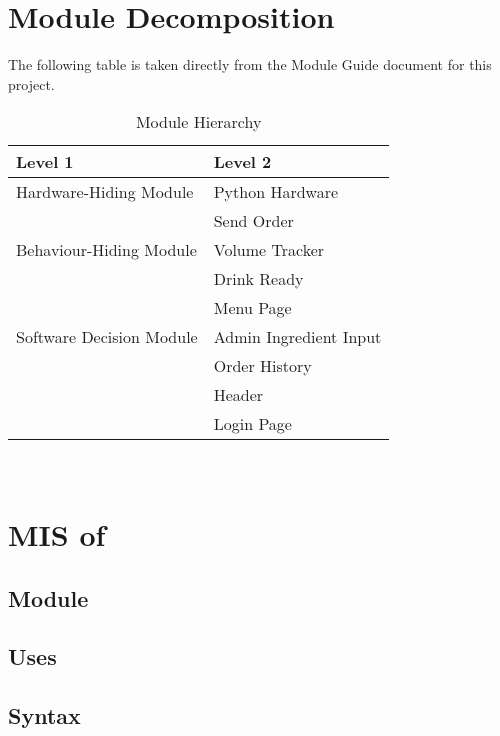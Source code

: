 \documentclass[12pt, titlepage]{article}
\begin{document}
\section{Module Decomposition}

The following table is taken directly from the Module Guide document for this project.

\begin{table}[h!]
\centering
\begin{tabular}{p{} p{}}
\toprule
\textbf{Level 1} & \textbf{Level 2}\\
\midrule

{Hardware-Hiding Module} & Python Hardware ~ \\
\midrule

\multirow{3}{0.3\textwidth}{Behaviour-Hiding Module}
& Send Order\\
& Volume Tracker\\
& Drink Ready\\
\midrule

\multirow{3}{0.3\textwidth}{Software Decision Module}
& Menu Page\\
& Admin Ingredient Input\\
& Order History\\
& Header\\
& Login Page\\
\bottomrule

\end{tabular}
\caption{Module Hierarchy}
\label{TblMH}
\end{table}

\newpage
~\newpage

\newpage
\section{MIS of }

\subsection{Module}


\subsection{Uses}


\subsection{Syntax}
\end{document}
